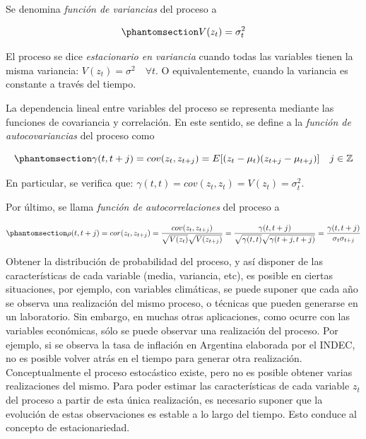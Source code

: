 \documentclass[12pt]{article}
\begin{document}
Se denomina \emph{función de variancias} del proceso a

\begin{equation}\phantomsection\label{eq-fc_de_variancias}{
V(z_t) = \sigma^2_t
}\end{equation}

El proceso se dice \emph{estacionario en variancia} cuando todas las
variables tienen la misma variancia:
\(V(z_t) = \sigma^2 \quad \forall t\). O equivalentemente, cuando la
variancia es constante a través del tiempo.

La dependencia lineal entre variables del proceso se representa mediante
las funciones de covariancia y correlación. En este sentido, se define a
la \emph{función de autocovariancias} del proceso como

\begin{equation}\phantomsection\label{eq-fc_de_covariancias}{
\gamma(t, t+j) = cov(z_t, z_{t+j}) = E[(z_t - \mu_t)(z_{t+j} - \mu_{t+j})] \quad j \in \mathbb{Z}
}\end{equation}

En particular, se verifica que:
\(\gamma(t,t) = cov(z_t, z_t) = V(z_t) = \sigma^2_t\).

Por último, se llama \emph{función de autocorrelaciones} del proceso a

\begin{equation}\phantomsection\label{eq-acf_general}{
\rho(t, t+j) = cor(z_t, z_{t+j}) = \dfrac{cov(z_t, z_{t+j})}{\sqrt{V(z_t)} \sqrt{V(z_{t+j})}} = \dfrac{\gamma(t, t+j)}{\sqrt{\gamma(t,t)} \sqrt{\gamma({t+j, t+j})}} = \dfrac{\gamma(t, t+j)}{\sigma_t \sigma_{t+j}}
}\end{equation}

Obtener la distribución de probabilidad del proceso, y así disponer de
las características de cada variable (media, variancia, etc), es posible
en ciertas situaciones, por ejemplo, con variables climáticas, se puede
suponer que cada año se observa una realización del mismo proceso, o
técnicas que pueden generarse en un laboratorio. Sin embargo, en muchas
otras aplicaciones, como ocurre con las variables económicas, sólo se
puede observar una realización del proceso. Por ejemplo, si se observa
la tasa de inflación en Argentina elaborada por el INDEC, no es posible
volver atrás en el tiempo para generar otra realización. Conceptualmente
el proceso estocástico existe, pero no es posible obtener varias
realizaciones del mismo. Para poder estimar las características de cada
variable \(z_t\) del proceso a partir de esta única realización, es
necesario suponer que la evolución de estas observaciones es estable a
lo largo del tiempo. Esto conduce al concepto de estacionariedad.
\end{document}
